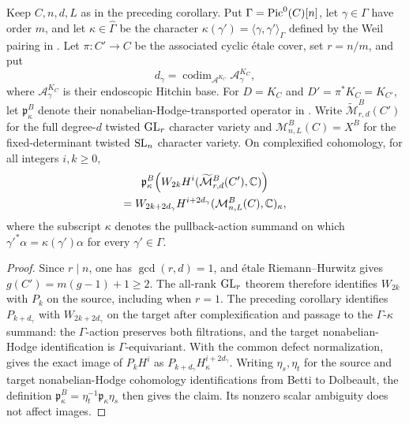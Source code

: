 \begin{corollary}\label{cor:endoscopic-weights}
Keep $C,n,d,L$ as in the preceding corollary. Put $\Gamma=\operatorname{Pic}^0(C)[n]$,
let $\gamma\in\Gamma$ have order $m$, and let $\kappa\in\widehat{\Gamma}$
be the character $\kappa(\gamma')=\langle\gamma,\gamma'\rangle_\Gamma$
defined by the Weil pairing in \cite[Section~1.3]{MSEndoscopy2021}. Let
$\pi:C'\to C$ be the associated cyclic \'etale cover, set $r=n/m$, and put
\[
d_\gamma=\operatorname{codim}_{\mathcal A^{K_C}}\mathcal A_\gamma^{K_C},
\]
where $\mathcal A_\gamma^{K_C}$ is their endoscopic Hitchin base.
For $D=K_C$ and $D'=\pi^*K_C=K_{C'}$, let $\mathfrak p_\kappa^B$ denote
their nonabelian-Hodge-transported operator in
\cite[Section~5.4]{MSEndoscopy2021}. Write
$\widetilde{\mathcal M}_{r,d}^B(C')$ for the full degree-$d$ twisted
$\operatorname{GL}_r$ character variety and $\mathcal M_{n,L}^B(C)=X^B$ for the
fixed-determinant twisted $\operatorname{SL}_n$ character variety. On complexified
cohomology, for all integers $i,k\ge0$,
\begin{multline*}
\mathfrak p_\kappa^B\!\left(W_{2k}H^i(\widetilde{\mathcal M}_{r,d}^B(C'),\mathbb C)\right)\\
=W_{2k+2d_\gamma}H^{i+2d_\gamma}(\mathcal M_{n,L}^B(C),\mathbb C)_\kappa,
\end{multline*}
where the subscript $\kappa$ denotes the pullback-action summand on which
$\gamma'^*\alpha=\kappa(\gamma')\alpha$ for every $\gamma'\in\Gamma$.
\end{corollary}
\begin{proof}
Since $r\mid n$, one has $\gcd(r,d)=1$, and \'etale Riemann--Hurwitz gives
$g(C')=m(g-1)+1\ge2$. The all-rank $\operatorname{GL}_r$ theorem
\cite[Theorem~0.2]{MS2024} therefore identifies $W_{2k}$ with $P_k$ on the
source, including when $r=1$. The preceding corollary identifies
$P_{k+d_\gamma}$ with $W_{2k+2d_\gamma}$ on the target after
complexification and passage to the $\Gamma$-$\kappa$ summand: the
$\Gamma$-action preserves both filtrations, and the target nonabelian-Hodge
identification is $\Gamma$-equivariant. With the common
defect normalization, \cite[Theorem~5.4]{MSEndoscopy2021} gives the exact
image of $P_kH^i$ as $P_{k+d_\gamma}H^{i+2d_\gamma}_\kappa$.
Writing $\eta_s,\eta_t$ for the source and target nonabelian-Hodge
cohomology identifications from Betti to Dolbeault, the definition
$\mathfrak p_\kappa^B=\eta_t^{-1}\mathfrak p_\kappa\eta_s$ then gives the
claim. Its nonzero scalar ambiguity does not affect images.
\end{proof}

